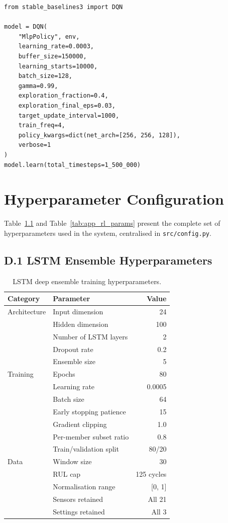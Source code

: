 \documentclass[12pt,a4paper]{report}
\begin{document}
\begin{verbatim}
from stable_baselines3 import DQN

model = DQN(
    "MlpPolicy", env,
    learning_rate=0.0003,
    buffer_size=150000,
    learning_starts=10000,
    batch_size=128,
    gamma=0.99,
    exploration_fraction=0.4,
    exploration_final_eps=0.03,
    target_update_interval=1000,
    train_freq=4,
    policy_kwargs=dict(net_arch=[256, 256, 128]),
    verbose=1
)
model.learn(total_timesteps=1_500_000)
\end{verbatim}



\chapter{Hyperparameter Configuration}
\label{app:hyperparams}

Table~\ref{tab:app_lstm_params} and Table~\ref{tab:app_rl_params} present the complete set of hyperparameters used in the system, centralised in \texttt{src/config.py}.

\section*{D.1 LSTM Ensemble Hyperparameters}

\begin{table}[h]
\centering
\caption{LSTM deep ensemble training hyperparameters.}
\label{tab:app_lstm_params}
\begin{tabular}{llr}
\toprule
\textbf{Category} & \textbf{Parameter} & \textbf{Value} \\
\midrule
Architecture & Input dimension & 24 \\
 & Hidden dimension & 100 \\
 & Number of LSTM layers & 2 \\
 & Dropout rate & 0.2 \\
 & Ensemble size & 5 \\
\midrule
Training & Epochs & 80 \\
 & Learning rate & 0.0005 \\
 & Batch size & 64 \\
 & Early stopping patience & 15 \\
 & Gradient clipping & 1.0 \\
 & Per-member subset ratio & 0.8 \\
 & Train/validation split & 80/20 \\
\midrule
Data & Window size & 30 \\
 & RUL cap & 125 cycles \\
 & Normalisation range & [0, 1] \\
 & Sensors retained & All 21 \\
 & Settings retained & All 3 \\
\bottomrule
\end{tabular}
\end{table}
\end{document}
